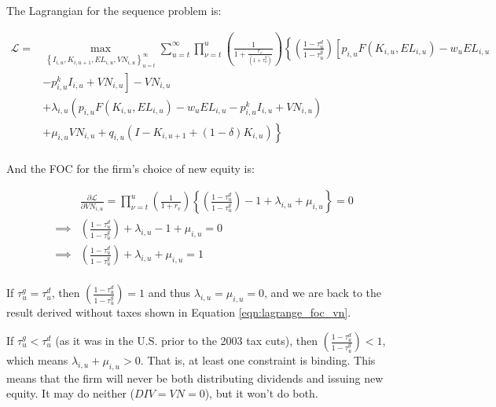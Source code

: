 \documentclass[letterpaper,12pt]{article}
\theoremstyle{definition}
\begin{document}
\begin{spacing}{1.5}
The Lagrangian for the sequence problem is:

\begin{equation}
\label{eqn:firm_lagrange_tax}
\begin{split}
\mathcal{L} = &  \max_{\left\{I_{i,u},K_{i,u+1},EL_{i,u},VN_{i,u}\right\}_{u=t}^{\infty}} \sum_{u=t}^{\infty} \prod_{\nu=t}^{u} \left(\frac{1}{1+\frac{r_{v}}{(1+\tau^{g}_{\nu})}}\right)\left\{ \left(\frac{1-\tau^{d}_{u}}{1-\tau^{g}_{u}}\right) \left[p_{i,u}F(K_{i,u},EL_{i,u}) - w_{u}EL_{i,u} \right. \right.\\
       & \left. \left. -p^{k}_{i,u}I_{i,u} +VN_{i,u}\right] - VN_{i,u} \right. \\
       &+\left. \lambda_{i,u}(p_{i,u}F(K_{i,u},EL_{i,u}) - w_{u}EL_{i,u} -p^{k}_{i,u}I_{i,u} +VN_{i,u}) \right. \\
       &+ \left. \mu_{i,u}VN_{i,u} + q_{i,u}(I - K_{i,u+1} + (1-\delta)K_{i,u})\right\} \\
\end{split}
\end{equation}

And the FOC for the firm's choice of new equity is:

\begin{equation}
\label{eqn:lagrange_foc_vn_tax}
\begin{split}
& \frac{\partial \mathcal{L}}{\partial VN_{i,u}} =   \prod_{\nu=t}^{u} \left(\frac{1}{1+r_{v}}\right) \left\{\left(\frac{1-\tau^{d}_{u}}{1-\tau^{g}_{u}}\right) - 1 +\lambda_{i,u}  + \mu_{i,u} \right\} = 0 \\
\implies & \left(\frac{1-\tau^{d}_{u}}{1-\tau^{g}_{u}}\right) +\lambda_{i,u}- 1  + \mu_{i,u}  = 0 \\
\implies &   \left(\frac{1-\tau^{d}_{u}}{1-\tau^{g}_{u}}\right) + \lambda_{i,u} + \mu_{i,u} = 1  \\
\end{split}
\end{equation}

If $\tau^{g}_{u}=\tau^{d}_{u}$, then $ \left(\frac{1-\tau^{d}_{u}}{1-\tau^{g}_{u}}\right)=1$ and thus $\lambda_{i,u}= \mu_{i,u}=0$, and we are back to the result derived without taxes shown in Equation \ref{eqn:lagrange_foc_vn}.

If $\tau^{g}_{u}<\tau^{d}_{u}$ (as it was in the U.S. prior to the 2003 tax cuts), then $ \left(\frac{1-\tau^{d}_{u}}{1-\tau^{g}_{u}}\right)<1$, which means $ \lambda_{i,u} + \mu_{i,u} >0$.  That is, at least one constraint is binding. This means that the firm will never be both distributing dividends and issuing new equity.  It may do neither ($DIV=VN=0$), but it won't do both.  


\end{spacing}
\end{document}
